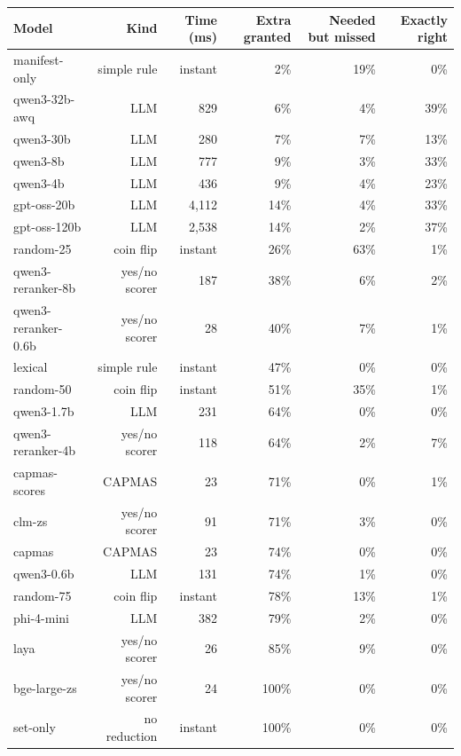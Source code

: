 \begin{tabular}{lrrrrr}
\toprule
Model & Kind & Time (ms) & Extra granted & Needed but missed & Exactly right \\
\midrule
manifest-only & simple rule & instant & 2\% & 19\% & 0\% \\
qwen3-32b-awq & LLM & 829 & 6\% & 4\% & 39\% \\
qwen3-30b & LLM & 280 & 7\% & 7\% & 13\% \\
qwen3-8b & LLM & 777 & 9\% & 3\% & 33\% \\
qwen3-4b & LLM & 436 & 9\% & 4\% & 23\% \\
gpt-oss-20b & LLM & 4,112 & 14\% & 4\% & 33\% \\
gpt-oss-120b & LLM & 2,538 & 14\% & 2\% & 37\% \\
random-25 & coin flip & instant & 26\% & 63\% & 1\% \\
qwen3-reranker-8b & yes/no scorer & 187 & 38\% & 6\% & 2\% \\
qwen3-reranker-0.6b & yes/no scorer & 28 & 40\% & 7\% & 1\% \\
lexical & simple rule & instant & 47\% & 0\% & 0\% \\
random-50 & coin flip & instant & 51\% & 35\% & 1\% \\
qwen3-1.7b & LLM & 231 & 64\% & 0\% & 0\% \\
qwen3-reranker-4b & yes/no scorer & 118 & 64\% & 2\% & 7\% \\
capmas-scores & CAPMAS & 23 & 71\% & 0\% & 1\% \\
clm-zs & yes/no scorer & 91 & 71\% & 3\% & 0\% \\
capmas & CAPMAS & 23 & 74\% & 0\% & 0\% \\
qwen3-0.6b & LLM & 131 & 74\% & 1\% & 0\% \\
random-75 & coin flip & instant & 78\% & 13\% & 1\% \\
phi-4-mini & LLM & 382 & 79\% & 2\% & 0\% \\
laya & yes/no scorer & 26 & 85\% & 9\% & 0\% \\
bge-large-zs & yes/no scorer & 24 & 100\% & 0\% & 0\% \\
set-only & no reduction & instant & 100\% & 0\% & 0\% \\
\bottomrule
\end{tabular}
